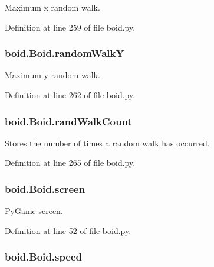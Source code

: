Maximum x random walk. 



Definition at line 259 of file boid.\-py.

\hypertarget{classboid_1_1Boid_a1bf0149b7eadf9e6a0f08c93d95bac73}{
\subsubsection[{random\-Walk\-Y}]{\setlength{\rightskip}{0pt plus 5cm}boid.\-Boid.\-random\-Walk\-Y}}\label{classboid_1_1Boid_a1bf0149b7eadf9e6a0f08c93d95bac73}


Maximum y random walk. 



Definition at line 262 of file boid.\-py.

\hypertarget{classboid_1_1Boid_af0bd96c51b17bc6c3f6fec2891b58a3d}{
\subsubsection[{rand\-Walk\-Count}]{\setlength{\rightskip}{0pt plus 5cm}boid.\-Boid.\-rand\-Walk\-Count}}\label{classboid_1_1Boid_af0bd96c51b17bc6c3f6fec2891b58a3d}


Stores the number of times a random walk has occurred. 



Definition at line 265 of file boid.\-py.

\hypertarget{classboid_1_1Boid_aa230e5710394a620995a3943fc9faa8d}{
\subsubsection[{screen}]{\setlength{\rightskip}{0pt plus 5cm}boid.\-Boid.\-screen}}\label{classboid_1_1Boid_aa230e5710394a620995a3943fc9faa8d}


Py\-Game screen. 



Definition at line 52 of file boid.\-py.

\hypertarget{classboid_1_1Boid_a4cf2a59e0efad2d71d8fee93fdd6538b}{
\subsubsection[{speed}]{\setlength{\rightskip}{0pt plus 5cm}boid.\-Boid.\-speed}}\label{classboid_1_1Boid_a4cf2a59e0efad2d71d8fee93fdd6538b}


